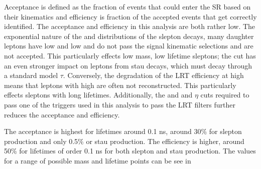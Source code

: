 Acceptance is defined as the fraction of events that could enter the \ac{SR} based on their kinematics and efficiency is fraction of the accepted events that get correctly identified. The acceptance and efficiency in this analysis are both rather low. The exponential nature of the \pt and \absdz distributions of the slepton decays, many daughter leptons have low \pt and low \absdz and do not pass the signal kinematic selections and are not accepted. This particularly effects low mass, low lifetime sleptons; the \pt cut has an even stronger impact on leptons from stau decays, which must decay through a standard model $\tau$. Conversely, the degradation of the \ac{LRT} efficiency at high \absdz means that leptons with high \absdz are often not reconstructed. This particularly effects sleptons with long lifetimes. Additionally, the \pt and \absdz and $\eta$ cuts required to pass one of the triggers used in this analysis to pass the \ac{LRT} filters further reduces the acceptance and efficiency.


The acceptance is highest for lifetimes around 0.1 ns, around 30\% for slepton production and only 0.5\% or stau production. The efficiency is higher, around 50\% for lifetimes of order 0.1 ns for both slepton and stau production. The values for a range of possible mass and lifetime points can be see in 







